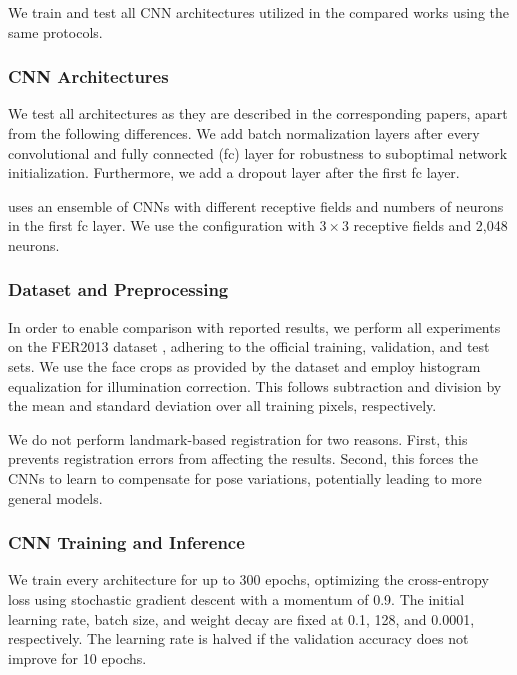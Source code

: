 \documentclass[conference,10pt,a4paper]{IEEEtran}
\begin{document}
We train and test all CNN architectures utilized in the compared works using the same protocols.

\subsubsection{CNN Architectures} \label{ssub:cnn_architectures_exp}

We test all architectures as they are described in the corresponding papers, apart from the following differences. We add batch normalization \cite{ioffe15} layers after every convolutional and fully connected (fc) layer for robustness to suboptimal network initialization. Furthermore, we add a dropout layer \cite{srivastava2014} after the first fc layer.

\cite{kim16} uses an ensemble of CNNs with different receptive fields and numbers of neurons in the first fc layer. We use the configuration with $3\times3$ receptive fields and 2,048 neurons.

\subsubsection{Dataset and Preprocessing} \label{ssub:dataset_and_preprocessing}

In order to enable comparison with reported results, we perform all experiments on the FER2013 dataset \cite{goodfellow15}, adhering to the official training, validation, and test sets. We use the face crops as provided by the dataset and employ histogram equalization for illumination correction. This follows subtraction and division by the mean and standard deviation over all training pixels, respectively.

We do not perform landmark-based registration for two reasons. First, this prevents registration errors from affecting the results. Second, this forces the CNNs to learn to compensate for pose variations, potentially leading to more general models.

\subsubsection{CNN Training and Inference} \label{ssub:cnn_training_and_inference}

We train every architecture for up to 300 epochs, optimizing the cross-entropy loss using stochastic gradient descent with a momentum of 0.9. The initial learning rate, batch size, and weight decay are fixed at 0.1,  128, and 0.0001, respectively. The learning rate is halved if the validation accuracy does not improve for 10 epochs.
\end{document}

